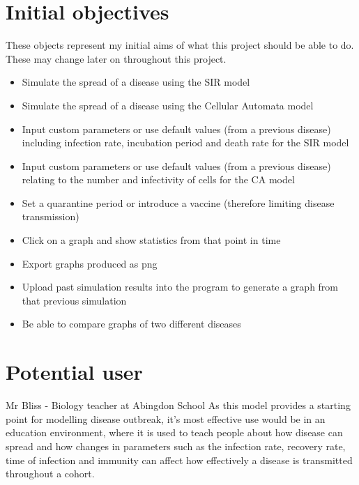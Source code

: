 \documentclass[11pt, a4paper]{article}
\begin{document}
\section{Initial objectives}
These objects represent my initial aims of what this project should be able to do. These may change later on throughout this project.
\begin{itemize}
    \item Simulate the spread of a disease using the SIR model
    \item Simulate the spread of a disease using the Cellular Automata model
    \item Input custom parameters or use default values (from a previous disease) including infection rate, incubation period and death rate for the SIR model
    \item Input custom parameters or use default values (from a previous disease) relating to the number and infectivity of cells for the CA model
    \item Set a quarantine period or introduce a vaccine (therefore limiting disease transmission)
    \item Click on a graph and show statistics from that point in time
    \item Export graphs produced as png
    \item Upload past simulation results into the program to generate a graph from that previous simulation
    \item Be able to compare graphs of two different diseases

\end{itemize}

\section{Potential user}
Mr Bliss - Biology teacher at Abingdon School
As this model provides a starting point for modelling disease outbreak, it’s most effective use would be in an education environment, where it is used to teach people about how disease can spread and how changes in parameters such as the infection rate, recovery rate, time of infection and immunity can affect how effectively a disease is transmitted throughout a cohort. 
\end{document}
